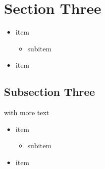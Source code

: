 \section{Section Three}
\begin{frame}[fragile]{\insertsection}{}
  \begin{itemize}
    \item item
    \begin{itemize}
      \item subitem
    \end{itemize}
    \item item
  \end{itemize}
\end{frame}

\subsection{Subsection Three}
\begin{frame}[fragile]{\insertsection with more text}{\insertsubsection}
  \begin{itemize}
    \item item
    \begin{itemize}
      \item subitem
    \end{itemize}
    \item item
  \end{itemize}
\end{frame}
